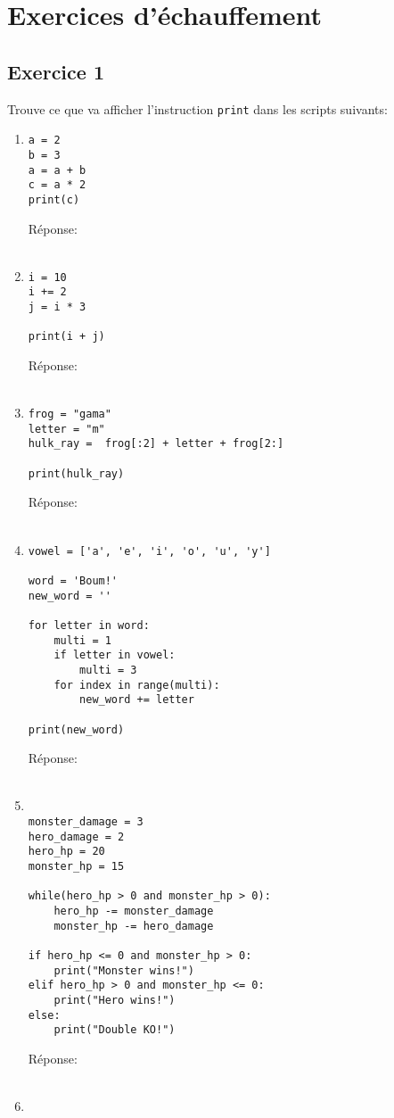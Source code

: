 \documentclass[12pt,a4paper]{article}
\newcommand{\codeintext}[1]{\texttt{#1}}
\newcommand{\response}[0]{Réponse:\hrulefill\\\\}
\begin{document}
\section*{Exercices d'échauffement}

\subsection*{Exercice 1}

Trouve ce que va afficher l'instruction \codeintext{print} dans les scripts suivants:

\begin{enumerate}

\item
\begin{lstlisting}
a = 2
b = 3
a = a + b
c = a * 2
print(c)
\end{lstlisting}
\response %

\item
\begin{lstlisting}
i = 10
i += 2
j = i * 3

print(i + j)
\end{lstlisting}
\response %

\item
\begin{lstlisting}
frog = "gama"
letter = "m"
hulk_ray =  frog[:2] + letter + frog[2:]

print(hulk_ray)
\end{lstlisting}
\response

\pagebreak
\item
\begin{lstlisting}
vowel = ['a', 'e', 'i', 'o', 'u', 'y']

word = 'Boum!'
new_word = ''

for letter in word:
	multi = 1
	if letter in vowel:
		multi = 3
	for index in range(multi):
		new_word += letter

print(new_word)
\end{lstlisting}
\response %

\item
\begin{lstlisting}

monster_damage = 3
hero_damage = 2
hero_hp = 20
monster_hp = 15

while(hero_hp > 0 and monster_hp > 0):
	hero_hp -= monster_damage
	monster_hp -= hero_damage

if hero_hp <= 0 and monster_hp > 0:
	print("Monster wins!")
elif hero_hp > 0 and monster_hp <= 0:
	print("Hero wins!")
else:
	print("Double KO!")
\end{lstlisting}
\response %
\pagebreak
\item
\begin{lstlisting}


\end{lstlisting}
\end{enumerate}
\end{document}
